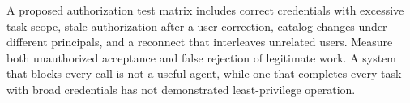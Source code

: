 A proposed authorization test matrix includes correct credentials with excessive task scope, stale authorization after a user correction, catalog changes under different principals, and a reconnect that interleaves unrelated users. Measure both unauthorized acceptance and false rejection of legitimate work. A system that blocks every call is not a useful agent, while one that completes every task with broad credentials has not demonstrated least-privilege operation.

